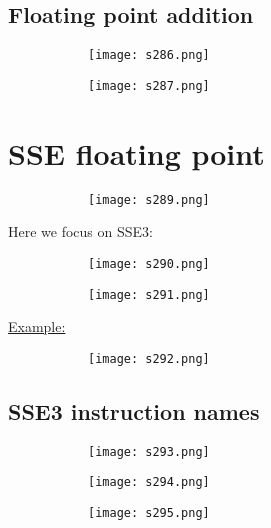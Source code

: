 \documentclass[8pt]{extreport}
\begin{document}
\subsection{Floating point addition}
\begin{figure}[H]
\centering
\begin{subfigure}[b]{0.4\linewidth}
\texttt{[image: s286.png]}
\end{subfigure}
\begin{subfigure}[b]{0.4\linewidth}
\texttt{[image: s287.png]}
\end{subfigure}
\end{figure}

\section{SSE floating point}
\begin{figure}[H]
\centering
\begin{subfigure}[b]{0.4\linewidth}
\texttt{[image: s289.png]}
\end{subfigure}
\end{figure}
Here we focus on SSE3:
\begin{figure}[H]
\centering
\begin{subfigure}[b]{0.4\linewidth}
\texttt{[image: s290.png]}
\end{subfigure}
\begin{subfigure}[b]{0.4\linewidth}
\texttt{[image: s291.png]}
\end{subfigure}
\end{figure}
\underline{Example:}
\begin{figure}[H]
\centering
\begin{subfigure}[b]{0.4\linewidth}
\texttt{[image: s292.png]}
\end{subfigure}
\end{figure}

\subsection{SSE3 instruction names}
\begin{figure}[H]
\centering
\begin{subfigure}[b]{0.4\linewidth}
\texttt{[image: s293.png]}
\end{subfigure}
\begin{subfigure}[b]{0.4\linewidth}
\texttt{[image: s294.png]}
\end{subfigure}
\begin{subfigure}[b]{0.4\linewidth}
\texttt{[image: s295.png]}
\end{subfigure}
\end{figure}
\end{document}
